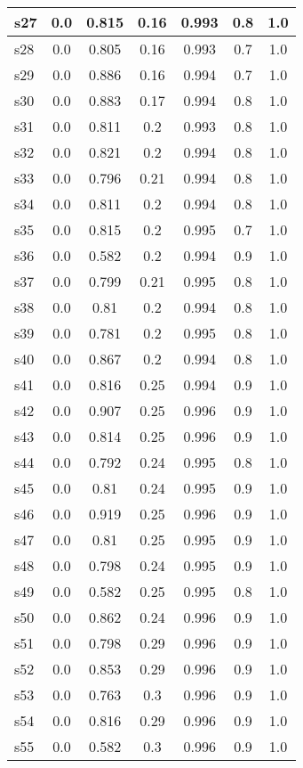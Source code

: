 \documentclass{article}
\begin{document}
\begin{tabular}{|l|c|c|c|c|c|c|}
\hline
s27 &0.0 & 0.815 & 0.16 & 0.993 & 0.8 & 1.0\\
\hline
s28 &0.0 & 0.805 & 0.16 & 0.993 & 0.7 & 1.0\\
\hline
s29 &0.0 & 0.886 & 0.16 & 0.994 & 0.7 & 1.0\\
\hline
s30 &0.0 & 0.883 & 0.17 & 0.994 & 0.8 & 1.0\\
\hline
s31 &0.0 & 0.811 & 0.2 & 0.993 & 0.8 & 1.0\\
\hline
s32 &0.0 & 0.821 & 0.2 & 0.994 & 0.8 & 1.0\\
\hline
s33 &0.0 & 0.796 & 0.21 & 0.994 & 0.8 & 1.0\\
\hline
s34 &0.0 & 0.811 & 0.2 & 0.994 & 0.8 & 1.0\\
\hline
s35 &0.0 & 0.815 & 0.2 & 0.995 & 0.7 & 1.0\\
\hline
s36 &0.0 & 0.582 & 0.2 & 0.994 & 0.9 & 1.0\\
\hline
s37 &0.0 & 0.799 & 0.21 & 0.995 & 0.8 & 1.0\\
\hline
s38 &0.0 & 0.81 & 0.2 & 0.994 & 0.8 & 1.0\\
\hline
s39 &0.0 & 0.781 & 0.2 & 0.995 & 0.8 & 1.0\\
\hline
s40 &0.0 & 0.867 & 0.2 & 0.994 & 0.8 & 1.0\\
\hline
s41 &0.0 & 0.816 & 0.25 & 0.994 & 0.9 & 1.0\\
\hline
s42 &0.0 & 0.907 & 0.25 & 0.996 & 0.9 & 1.0\\
\hline
s43 &0.0 & 0.814 & 0.25 & 0.996 & 0.9 & 1.0\\
\hline
s44 &0.0 & 0.792 & 0.24 & 0.995 & 0.8 & 1.0\\
\hline
s45 &0.0 & 0.81 & 0.24 & 0.995 & 0.9 & 1.0\\
\hline
s46 &0.0 & 0.919 & 0.25 & 0.996 & 0.9 & 1.0\\
\hline
s47 &0.0 & 0.81 & 0.25 & 0.995 & 0.9 & 1.0\\
\hline
s48 &0.0 & 0.798 & 0.24 & 0.995 & 0.9 & 1.0\\
\hline
s49 &0.0 & 0.582 & 0.25 & 0.995 & 0.8 & 1.0\\
\hline
s50 &0.0 & 0.862 & 0.24 & 0.996 & 0.9 & 1.0\\
\hline
s51 &0.0 & 0.798 & 0.29 & 0.996 & 0.9 & 1.0\\
\hline
s52 &0.0 & 0.853 & 0.29 & 0.996 & 0.9 & 1.0\\
\hline
s53 &0.0 & 0.763 & 0.3 & 0.996 & 0.9 & 1.0\\
\hline
s54 &0.0 & 0.816 & 0.29 & 0.996 & 0.9 & 1.0\\
\hline
s55 &0.0 & 0.582 & 0.3 & 0.996 & 0.9 & 1.0\\

\end{tabular}
\end{document}
